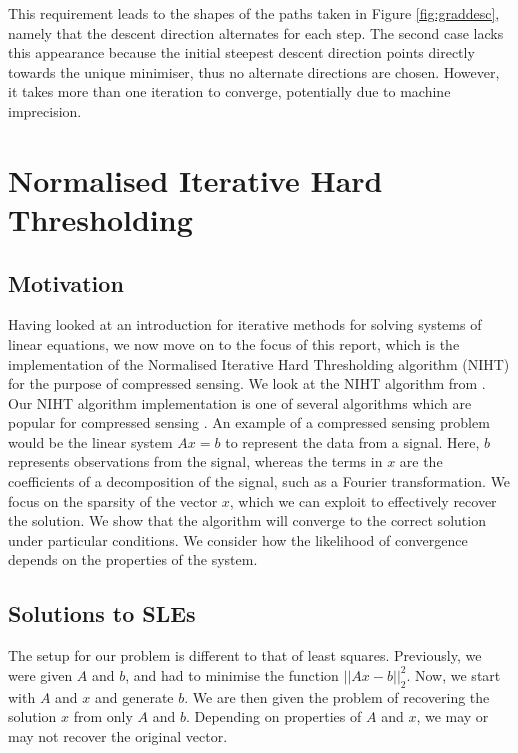 \documentclass{article}
\begin{document}
This requirement leads to the shapes of the paths taken in Figure \ref{fig:graddesc},
namely that the descent direction alternates for each step.
The second case lacks this appearance because the initial steepest descent direction points directly towards the unique minimiser,
thus no alternate directions are chosen. However, it takes more than one iteration to converge, potentially due to machine imprecision.

\section{Normalised Iterative Hard Thresholding}

\subsection{Motivation}

Having looked at an introduction for iterative methods for solving systems of linear equations,
we now move on to the focus of this report, which is the implementation of the Normalised Iterative Hard Thresholding algorithm (NIHT) for the purpose of compressed sensing.
We look at the NIHT algorithm from \cite{blumensath2010normalized}.
Our NIHT algorithm implementation is one of several algorithms which are popular for compressed sensing \cite{blanchard2013gpu}.
An example of a compressed sensing problem would be the linear system $Ax = b$ to represent the data from a signal.
Here, $b$ represents observations from the signal, whereas the terms in $x$ are the coefficients of a decomposition of the signal, such as a Fourier transformation.
We focus on the sparsity of the vector $x$, which we can exploit to effectively recover the solution.
We show that the algorithm will converge to the correct solution under particular conditions.
We consider how the likelihood of convergence depends on the properties of the system.

\subsection{Solutions to SLEs}
The setup for our problem is different to that of least squares.
Previously, we were given $A$ and $b$, and had to minimise the function $||Ax-b||_2^2$.
Now, we start with $A$ and $x$ and generate $b$. We are then given the problem of recovering the solution $x$ from only $A$ and $b$.
Depending on properties of $A$ and $x$, we may or may not recover the original vector.
\end{document}
